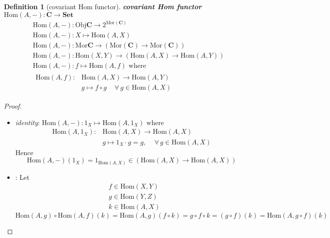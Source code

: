 \documentclass[10pt]{amsart}
\newtheorem{definition}{Definition}
\newenvironment{claim}[1]{\par\noindent\underline{Claim:}\space#1}{}
\begin{document}
\begin{multicols*}{2}
\begin{definition}[covariant Hom functor]
	\textbf{covariant Hom functor} $\text{Hom}(A, -): \mathbf{C} \to \mathbf{Set}$
	\begin{equation}
	\begin{aligned}
	& \text{Hom}(A, - ) : \text{Obj}\mathbf{C} \to  2^{\text{Mor}(\mathbf{C})} \\ 
	& \text{Hom}(A, - ) : X \mapsto \text{Hom}(A,X) \\ 
	& \text{Hom}(A, - ) : \text{Mor}\mathbf{C} \to (\text{Mor}(\mathbf{C}) \to \text{Mor}(\mathbf{C})) \\
	& \text{Hom}(A, - ) : \text{Hom}(X,Y) \to (\text{Hom}(A,X) \to \text{Hom}(A,Y)) \\
	& \text{Hom}(A, - ) : f \mapsto \text{Hom}(A,f) \text{ where } \\
	& \begin{aligned} \text{Hom}(A,f) : & \text{Hom}(A,X) \to \text{Hom}(A,Y) \\ 
	& g\mapsto f\circ g \quad \, \forall \, g \in \text{Hom}(A,X) 
	\end{aligned} 
	\end{aligned}
	\end{equation}
\end{definition}


\begin{proof}
	\begin{itemize}
		\item \emph{identity}: $\text{Hom}(A,-) : 1_X \mapsto \text{Hom}(A, 1_X) \text{ where }$ 
		\[
		\begin{aligned}
			\text{Hom}(A, 1_X) : & \text{Hom}(A,X) \to \text{Hom}(A,X) \\ 
			& g\mapsto 1_X \cdot g = g , \quad \, \forall \, g\in \text{Hom}(A,X)
		\end{aligned}
		\]
		Hence
		\[
		\text{Hom}(A, -)(1_X) = 1_{\text{Hom}(A,X)} \in (\text{Hom}(A,X) \to \text{Hom}(A,X))
		\]
		\item {}: Let 
		\[
		\begin{aligned}
		& f \in \text{Hom}(X,Y) \\ 
		& g \in \text{Hom}(Y,Z) \\ 
		& k \in \text{Hom}(A,X) 
		\end{aligned}
		\]
		\[
		\text{Hom}(A, g) \circ \text{Hom}(A,f)(k) = \text{Hom}(A,g)(f\circ k) = g\circ f \circ k = (g\circ f)(k) = \text{Hom}(A, g\circ f)(k)
		\]
	\end{itemize}
\end{proof}


\end{multicols*}
\end{document}
